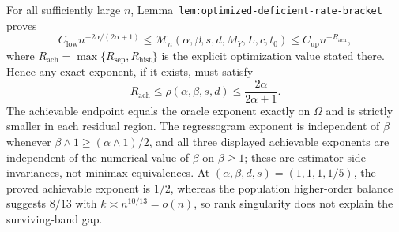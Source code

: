 For all sufficiently large \(n\), Lemma~\texttt{lem:optimized-deficient-rate-bracket} proves
\[
C_{\mathrm{low}}n^{-2\alpha/(2\alpha+1)}
\le
\mathcal M_n(\alpha,\beta,s,d,M_Y,L,c,t_0)
\le
C_{\mathrm{up}}n^{-R_{\mathrm{ach}}},
\]
where \(R_{\mathrm{ach}}=\max\{R_{\mathrm{sep}},R_{\mathrm{hist}}\}\) is the explicit optimization value stated there. Hence any exact exponent, if it exists, must satisfy
\[
R_{\mathrm{ach}}
\le \rho(\alpha,\beta,s,d)
\le \frac{2\alpha}{2\alpha+1}.
\]
The achievable endpoint equals the oracle exponent exactly on \(\Omega\) and is strictly smaller in each residual region. The regressogram exponent is independent of \(\beta\) whenever \(\beta\wedge1\ge(\alpha\wedge1)/2\), and all three displayed achievable exponents are independent of the numerical value of \(\beta\) on \(\beta\ge1\); these are estimator-side invariances, not minimax equivalences. At \((\alpha,\beta,d,s)=(1,1,1,1/5)\), the proved achievable exponent is \(1/2\), whereas the population higher-order balance suggests \(8/13\) with \(k\asymp n^{10/13}=o(n)\), so rank singularity does not explain the surviving-band gap.